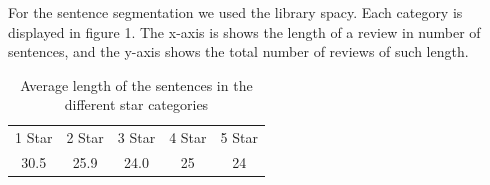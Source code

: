 For the sentence segmentation we used the library spacy. Each category is displayed in figure 1. The x-axis is shows the length of a review in number of sentences, and the y-axis shows the total number of reviews of such length. 
	\begin{center}
		\begin{table}[!h]
			\caption{Average length of the sentences in the different star categories}
			\begin{tabular}{ c c c c c}
				1 Star & 2 Star & 3 Star  & 4 Star & 5 Star\\
				30.5 & 25.9 & 24.0  & 25 & 24\\
			\end{tabular}
		\end{table}
	\end{center}
	
